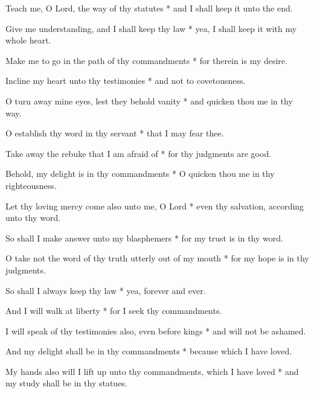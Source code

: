 Teach me, O Lord, the way of thy statutes * and I shall keep it unto the end.

Give me understanding, and I shall keep thy law * yea, I shall keep it with my whole heart.

Make me to go in the path of thy commandments * for therein is my desire.

Incline my heart unto thy testimonies * and not to covetousness.

O turn away mine eyes, lest they behold vanity * and quicken thou me in thy way.

O establish thy word in thy servant * that I may fear thee.

Take away the rebuke that I am afraid of * for thy judgments are good.

Behold, my delight is in thy commandments * O quicken thou me in thy righteousness.

Let thy loving mercy come also unto me, O Lord * even thy salvation, according unto thy word.

So shall I make answer unto my blasphemers * for my trust is in thy word.

O take not the word of thy truth utterly out of my mouth * for my hope is in thy judgments.

So shall I always keep thy law * yea, forever and ever.

And I will walk at liberty * for I seek thy commandments.

I will speak of thy testimonies also, even before kings * and will not be ashamed.

And my delight shall be in thy commandments * because which I have loved.

My hands also will I lift up unto thy commandments, which I have loved * and my study shall be in thy statues.